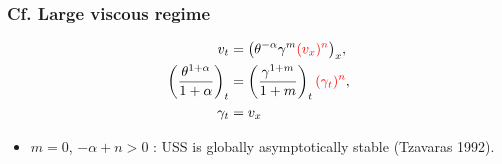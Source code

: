 \documentclass{beamer}
\def\red{\color{red}}
\begin{document}
% 
% 
% 
% 
% 

\begin{frame}
 \frametitle{Cf. Large viscous regime}
 \begin{align*}
  v_t &= \big(\theta^{-\alpha}\gamma^m {\red (v_x)^n}\big)_x,\\
  \left(\frac{\theta^{1+\alpha}}{1+\alpha}\right)_t &= \left(\frac{\gamma^{1+m}}{1+m}\right)_t{\red (\gamma_t)^n},\\
  \gamma_t&=v_x
 \end{align*}
 \begin{itemize}
  \item $m=0$, $-\alpha+n>0$ :  USS is globally asymptotically stable {\footnotesize (Tzavaras 1992)}.
 \end{itemize}

  
  \vfill
\end{frame}
\end{document}
